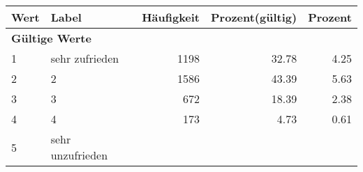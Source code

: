      \begin{longtable}{lXrrr}
     \toprule
     \textbf{Wert} & \textbf{Label} & \textbf{Häufigkeit} & \textbf{Prozent(gültig)} & \textbf{Prozent} \\
     \endhead
     \midrule
     \multicolumn{5}{l}{\textbf{Gültige Werte}}\\

     1 &
     \multicolumn{1}{X}{ sehr zufrieden   } &


       \num{1198} &
       \num[round-mode=places,round-precision=2]{32.78} &
         \num[round-mode=places,round-precision=2]{4.25} \\

     2 &
     \multicolumn{1}{X}{ 2   } &


       \num{1586} &
       \num[round-mode=places,round-precision=2]{43.39} &
         \num[round-mode=places,round-precision=2]{5.63} \\

     3 &
     \multicolumn{1}{X}{ 3   } &


       \num{672} &
       \num[round-mode=places,round-precision=2]{18.39} &
         \num[round-mode=places,round-precision=2]{2.38} \\

     4 &
     \multicolumn{1}{X}{ 4   } &


       \num{173} &
       \num[round-mode=places,round-precision=2]{4.73} &
         \num[round-mode=places,round-precision=2]{0.61} \\

     5 &
     \multicolumn{1}{X}{ sehr unzufrieden   } &



\end{longtable}
